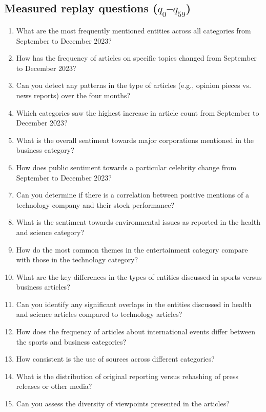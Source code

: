 \subsection{Measured replay questions (\texorpdfstring{$q_0$--$q_{59}$}{q0-q59})}
\begin{footnotesize}
\begin{enumerate}[label={\(q_{\arabic*}\).},start=0]
\setlength{\itemsep}{1pt}
\item What are the most frequently mentioned entities across all categories from September to December 2023?
\item How has the frequency of articles on specific topics changed from September to December 2023?
\item Can you detect any patterns in the type of articles (e.g., opinion pieces vs. news reports) over the four months?
\item Which categories saw the highest increase in article count from September to December 2023?
\item What is the overall sentiment towards major corporations mentioned in the business category?
\item How does public sentiment towards a particular celebrity change from September to December 2023?
\item Can you determine if there is a correlation between positive mentions of a technology company and their stock performance?
\item What is the sentiment towards environmental issues as reported in the health and science category?
\item How do the most common themes in the entertainment category compare with those in the technology category?
\item What are the key differences in the types of entities discussed in sports versus business articles?
\item Can you identify any significant overlaps in the entities discussed in health and science articles compared to technology articles?
\item How does the frequency of articles about international events differ between the sports and business categories?
\item How consistent is the use of sources across different categories?
\item What is the distribution of original reporting versus rehashing of press releases or other media?
\item Can you assess the diversity of viewpoints presented in the articles?

\end{enumerate}
\end{footnotesize}
